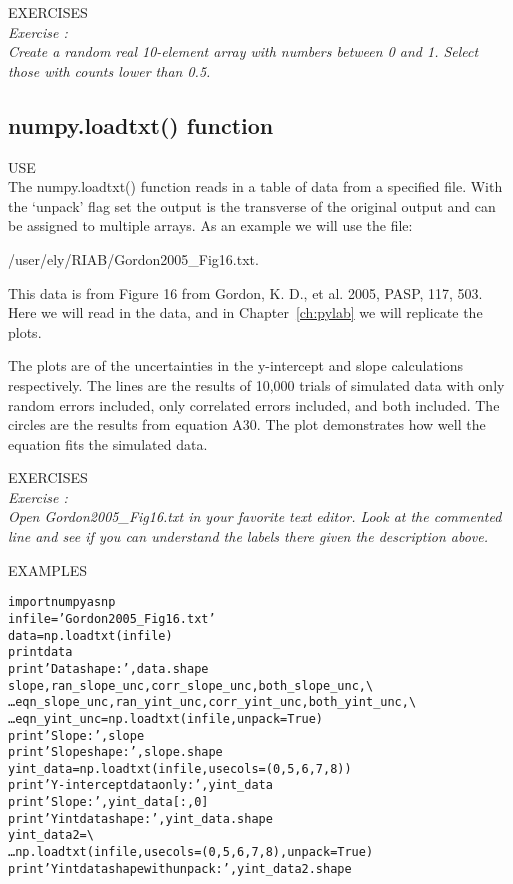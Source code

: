 {\color{blue} {\sf\small EXERCISES}} \\
{\it Exercise  :  \\
Create a random real 10-element array with numbers between 0 and 1.
Select those with counts lower than 0.5.}

\subsection{ {\sf numpy.loadtxt() } function}
\label{ss:loadtxt}

{\color{blue} {\sf\small USE}} \\
The {\sf\small numpy.loadtxt()} function reads in a table of data
from a specified file.  With the `unpack' flag set the output is the
transverse of the original output and can be assigned to multiple
arrays.  As an example we will use the file: 

/user/ely/RIAB/Gordon2005\_Fig16.txt. 

This data is from Figure 16 from Gordon, K. D., et al. 2005, PASP,
117, 503.  Here we will read in the data, and in
Chapter~\ref{ch:pylab} we will replicate the plots.

The plots are of the uncertainties in the y-intercept and
slope calculations respectively.  The lines are the results of 10,000
trials of simulated data with only random errors included, only
correlated errors included, and both included.  The circles are the
results from  equation A30.  The plot demonstrates how well the
equation fits the simulated data. 

{\color{blue} {\sf\small EXERCISES}} \\
{\it Exercise  :  \\
  Open Gordon2005\_Fig16.txt in your favorite text editor.  Look at the
  commented line and see if you can understand the labels there given
  the description above.}

{\color{blue} {\sf\small EXAMPLES}} \\
\begin{alltt}
\pytab import numpy as np 
\pytab infile = 'Gordon2005_Fig16.txt' 
\pytab data = np.loadtxt(infile) 
\pytab print data 
\pytab print 'Data shape: ',data.shape  
\pytab slope, ran_slope_unc, corr_slope_unc, both_slope_unc,  \textbackslash
\ldots     eqn_slope_unc, ran_yint_unc, corr_yint_unc, both_yint_unc,  \textbackslash
\ldots     eqn_yint_unc = np.loadtxt(infile, unpack=True) 
\pytab print 'Slope: ', slope 
\pytab print 'Slope shape: ',slope.shape  
\pytab yint_data = np.loadtxt(infile,usecols=(0,5,6,7,8)) 
\pytab print 'Y-intercept data only: ',yint_data  
\pytab print 'Slope: ',yint_data[:,0]  
\pytab print 'Yint data shape: ',yint_data.shape 
\pytab yint_data2 =  \textbackslash
\ldots     np.loadtxt(infile,usecols=(0,5,6,7,8),unpack=True)  
\pytab print 'Yint data shape with unpack: ',yint_data2.shape
\end{alltt}

